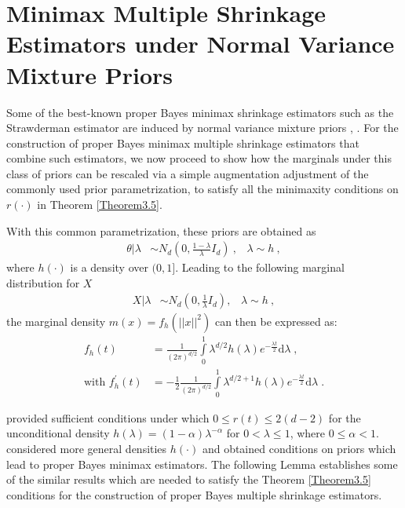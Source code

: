\documentclass[11pt]{article}
\theoremstyle{definition}
\begin{document}
\section{Minimax Multiple Shrinkage Estimators under Normal Variance Mixture Priors}
\label{Adjusting priors yielding scaled marginals}
Some of the best-known proper Bayes minimax shrinkage estimators such as the Strawderman estimator are induced by normal variance mixture priors \cite{FSW1998}, \cite{s1971}.  For the construction of proper Bayes minimax multiple shrinkage estimators that combine such estimators, we now proceed to show how the marginals under this class of priors can be rescaled via a simple augmentation adjustment of the commonly used prior parametrization, to satisfy all the minimaxity conditions on $r(\cdot)$ in Theorem \ref{Theorem3.5}.

With this common parametrization, these priors are obtained as
\begin{align} \label{initialparametrization}
  \theta | \lambda & \sim N_d\left(0, \frac{1 - \lambda}{\lambda}I_d\right)\:, \;\;\; \lambda \sim h\:,
\end{align}
where $h(\cdot)$ is a density over $(0,1]$. Leading to the following marginal distribution for $X$
\begin{align}
   \nonumber  X | \lambda & \sim N_d\left(0, \frac{1 }{\lambda}I_d\right), \;\;\; \lambda \sim h\:,
\end{align}
the marginal density $m(x) = f_{h}(||x||^2)$ can then be expressed as\hspace{-1mm}:
\begin{align}
   \nonumber  f_h(t) &  = \frac{1}{(2\pi)^{d/2}}\int\limits_{0}^1 \lambda^{d/2} h(\lambda) e^{-\frac{\lambda t}{2}} \text{d}\lambda\;, \\
   \nonumber \text{with } f_h^{'}(t) & = -\frac{1}{2}\frac{1}{(2\pi)^{d/2}}\int\limits_{0}^1 \lambda^{d/2 + 1} h(\lambda) e^{-\frac{\lambda t}{2}} \text{d}\lambda\;.
\end{align}


\cite{s1971} provided sufficient conditions under which $0 \leq r(t) \leq 2(d-2)$ for the unconditional density $h(\lambda) = (1-\alpha)\lambda^{-\alpha} $ for $0 < \lambda \leq 1$, where $0 \leq \alpha < 1$. \cite{FSW1998} considered more general densities $h(\cdot)$ and obtained conditions on priors which lead to proper Bayes minimax estimators. The following Lemma establishes some of the similar results which are needed to satisfy the Theorem \ref{Theorem3.5} conditions for the construction of proper Bayes multiple shrinkage estimators.
\end{document}
